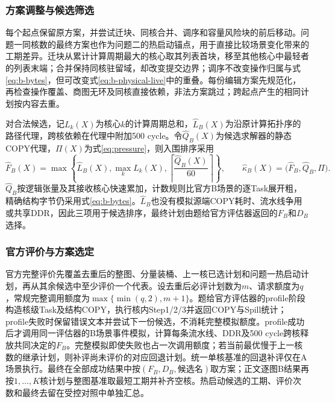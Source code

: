 \subsubsection{方案调整与候选筛选}
每个起点保留原方案，并尝试迁块、同核合并、调序和容量风险块的前后移动。问题一同核数的最终方案也作为问题二的热启动锚点，用于直接比较场景变化带来的工期差异。迁块从累计计算周期最大的核心取其列表首块，移至其他核心中最轻者的列表末端；合并保持同核驻留域，却改变提交边界；调序不改变操作归属与式\eqref{eq:b-bytes}，但可改变式\eqref{eq:b-physical-live}中的重叠。每份编辑方案先规范化，再检查操作覆盖、商图无环及同核直接依赖，非法方案跳过；跨起点产生的相同计划按内容去重。

对合法候选，记$L_k(X)$为核心$k$的计算周期总和，$\widehat L_B(X)$为沿原计算拓扑序的路径代理，跨核依赖在代理中附加500 cycle。令$\widehat Q_B(X)$为候选求解器的静态COPY代理，$\Pi(X)$为式\eqref{eq:pressure}，则入围排序采用
\begin{equation}
\widehat F_B(X)=\max\left\{\widehat L_B(X),\max_k L_k(X),
\left\lceil\frac{\widehat Q_B(X)}{60}\right\rceil\right\},\qquad
\widehat\kappa_B(X)=\bigl(\widehat F_B,\widehat Q_B,\Pi\bigr).
\label{eq:b-light-score}
\end{equation}
$\widehat Q_B$按逻辑张量及其接收核心快速累加，计数规则比官方B场景的逐Task展开粗，精确结构字节仍采用式\eqref{eq:b-bytes}。$\widehat L_B$也没有模拟源端COPY耗时、流水线争用或共享DDR，因此三项用于候选排序，最终计划由题给官方评估器返回的$F_B$和$D_B$选择。

\subsubsection{官方评价与方案选定}
官方完整评价先覆盖去重后的整图、分量装桶、上一核已选计划和问题一热启动计划，再从其余候选中至少评价一个代表。设去重后必评计划数为$m$、请求额度为$q$，常规完整调用额度为$\max\{\min(q,2),m+1\}$。题给官方评估器的profile阶段构造核级Task及结构COPY，执行核内Step1/2/3并返回COPY与Spill统计；profile失败时保留错误文本并尝试下一份候选，不消耗完整模拟额度。profile成功后才调用同一评估器的B场景事件模拟，计算每条流水线、DDR及500 cycle跨核释放共同决定的$F_B$。完整模拟即使失败也占一次调用额度；若当前最优慢于上一核数的继承计划，则补评尚未评价的对应回退计划。统一单核基准的回退补评仅在A场景执行。最终在全部成功结果中按$(F_B,D_B,\text{候选名})$取方案；正文逐图B结果再按$1,\ldots,K$核计划与整图基准取最短工期并补齐空核。热启动候选的工期、评价次数和最终去留在受控对照中单独汇总。

